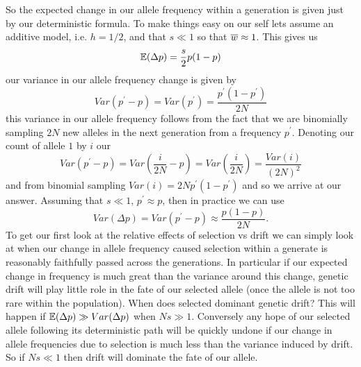 So the expected change in our allele frequency within a generation is given just by our
deterministic formula. To make things easy on our self lets assume an
additive model, i.e. $h=1/2$, and that $s \ll 1$ so that $\overline{w}
\approx 1$. This gives us
\begin{equation}
\mathbb{E}(\Delta p ) = \frac{s}{2} p(1-p) \label{eqn:WF_mean}
\end{equation}
our variance in our allele frequency change is given by
\begin{equation}
Var(p^{\prime} - p) = Var(p^{\prime}) = \frac{p^{\prime}(1-p^{\prime})}{2N}
\end{equation}
this variance in our allele frequency follows from the fact that we
are binomially sampling $2N$ new alleles in the next
generation from a frequency $p^{\prime}$. Denoting our count of allele $1$ by $i$ our
\begin{equation}
Var(p^{\prime} - p) = Var(\frac{i}{2N} - p) =  Var(\frac{i}{2N} ) =\frac{Var(i)}{(2N)^2}
\end{equation}
and from binomial sampling $Var(i) = 2N p^{\prime}(1-p^{\prime})$ and
so we arrive at our answer. Assuming that $s \ll 1$, $p^{\prime}
\approx p$, then in practice we can use
\begin{equation}
Var(\Delta p)  =Var(p^{\prime} - p) \approx \frac{p(1-p)}{2N}. \label{eqn:WF_var}
\end{equation}
To get our first look at the relative effects of selection vs drift we
can simply look at when our change in allele frequency caused
selection within a generate is reasonably faithfully passed across
the generations. In particular if our expected change in frequency is much
great than the variance around this change, genetic drift will play
little role in the fate of our selected allele (once the allele is not
too rare within the population). When does selected
dominant genetic drift? This will happen if $\mathbb{E}(\Delta p) \gg Var(\Delta p)$ when $Ns \gg 1$. Conversely any
hope of our selected allele following its deterministic path will be quickly undone if our change in allele frequencies due to selection is
much less than the variance induced by drift. So if $Ns \ll 1$ then
drift will dominate the fate of our allele. \\
